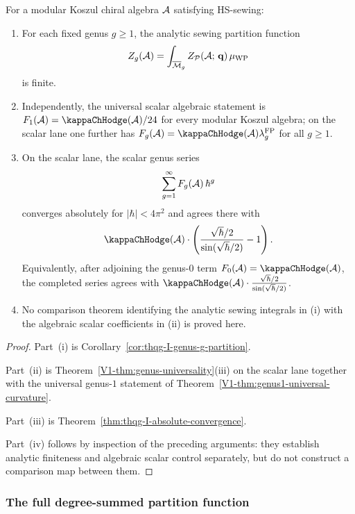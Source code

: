 \begin{proposition}
For a modular Koszul chiral algebra $\mathcal{A}$ satisfying HS-sewing:
\begin{enumerate}[label=\textup{(\roman*)}]
\item For each fixed genus $g \geq 1$, the analytic sewing partition
function
\[
Z_g(\mathcal{A}) = \int_{\overline{\mathcal{M}}_g}
Z_{\mathcal{P}}(\mathcal{A};\,\mathbf{q})\,\mu_{\mathrm{WP}}
\]
is finite.
\item Independently, the universal scalar algebraic statement is
$F_1(\cA)=\kappaChHodge(\cA)/24$ for every modular Koszul algebra; on the
scalar lane one further has
$F_g(\cA)=\kappaChHodge(\cA)\lambda_g^{\mathrm{FP}}$ for all $g \geq 1$.
\item On the scalar lane, the scalar genus series
\[
\sum_{g=1}^{\infty} F_g(\mathcal{A})\,\hbar^g
\]
converges absolutely for $|\hbar| < 4\pi^2$ and agrees there with
\[
\kappaChHodge(\cA)\cdot\left(\frac{\sqrt{\hbar}/2}{\sin(\sqrt{\hbar}/2)} - 1\right).
\]
Equivalently, after adjoining the genus-$0$ term
$F_0(\cA)=\kappaChHodge(\cA)$, the completed series agrees with
$\kappaChHodge(\cA)\cdot\frac{\sqrt{\hbar}/2}{\sin(\sqrt{\hbar}/2)}$.
\item No comparison theorem identifying the analytic sewing integrals
in \textup{(i)} with the algebraic scalar coefficients in
\textup{(ii)} is proved here.
\end{enumerate}
\end{proposition}

\begin{proof}
Part~(i) is Corollary~\ref{cor:thqg-I-genus-g-partition}.

Part~(ii) is Theorem~\ref{V1-thm:genus-universality}\textup{(iii)} on the
scalar lane together with the universal genus-$1$
statement of Theorem~\ref{V1-thm:genus1-universal-curvature}.

Part~(iii) is Theorem~\ref{thm:thqg-I-absolute-convergence}.

Part~(iv) follows by inspection of the preceding arguments: they
establish analytic finiteness and algebraic scalar control separately,
but do not construct a comparison map between them.
\end{proof}

\subsubsection{The full degree-summed partition function}

